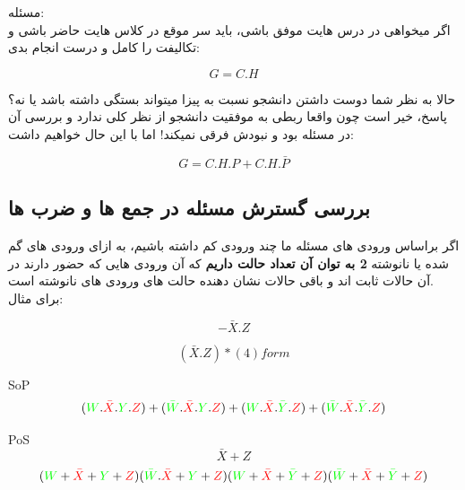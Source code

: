 \documentclass[20pt, a4paper]{article}
\begin{document}
مسئله:\\

اگر میخواهی در درس هایت موفق باشی، باید
سر موقع در کلاس هایت حاضر باشی و تکالیفت را کامل 
و درست انجام بدی:
\begin{LTR}
	\begin{equation}
		G = C . H
	\end{equation}
\end{LTR}
حالا به نظر شما دوست داشتن دانشجو نسبت به پیزا میتواند بستگی
داشته باشد یا نه؟
پاسخ، خیر است چون واقعا ربطی به موفقیت دانشجو از نظر کلی
ندارد و بررسی آن در مسئله بود و نبودش فرقی نمیکند! اما با این حال خواهیم داشت:

\begin{LTR}
	\begin{equation}
		G = C.H.P + C.H.\bar{P} 
	\end{equation}
\end{LTR}

\subsection{بررسی گسترش مسئله در جمع ها و ضرب ها}
اگر براساس ورودی های مسئله ما چند ورودی کم داشته باشیم،
به ازای ورودی های گم شده یا نانوشته
\textbf{ 2 به توان آن تعداد حالت داریم}
که آن ورودی هایی که حضور دارند در آن حالات ثابت اند و 
باقی حالات نشان دهنده حالت های ورودی های نانوشته است.\\
برای مثال:

\begin{LTR}
	\begin{equation}
		- \bar{X}.Z
	\end{equation}

	\begin{equation}
		(\bar{X}.Z)*(4)form
	\end{equation}

	SoP\\
	\begin{equation}
		(\textcolor{green}{W}.\textcolor{red}{\bar{X}}.\textcolor{green}{Y}.\textcolor{red}{Z})+
		(\textcolor{green}{\bar{W}}.\textcolor{red}{\bar{X}}.\textcolor{green}{Y}.\textcolor{red}{Z})+
		(\textcolor{green}{W}.\textcolor{red}{\bar{X}}.\textcolor{green}{\bar{Y}}.\textcolor{red}{Z})+
		(\textcolor{green}{\bar{W}}.\textcolor{red}{\bar{X}}.\textcolor{green}{\bar{Y}}.\textcolor{red}{Z})
	\end{equation}

	PoS\\
	\begin{equation}
		\bar{X}+Z
	\end{equation}
	\begin{equation}
		(\textcolor{green}{W}+\textcolor{red}{\bar{X}}+\textcolor{green}{Y}+\textcolor{red}{Z})
		(\textcolor{green}{\bar{W}}.\textcolor{red}{\bar{X}}+\textcolor{green}{Y}+\textcolor{red}{Z})
		(\textcolor{green}{W}+\textcolor{red}{\bar{X}}+\textcolor{green}{\bar{Y}}+\textcolor{red}{Z})
		(\textcolor{green}{\bar{W}}+\textcolor{red}{\bar{X}}+\textcolor{green}{\bar{Y}}+\textcolor{red}{Z})
	\end{equation}
\end{LTR}
\newpage
\end{document}

